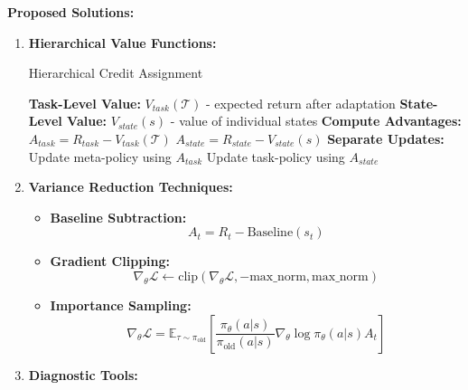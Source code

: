 \documentclass[12pt]{article}
\begin{document}
{{			\textbf{Proposed Solutions:}
			
			\begin{enumerate}
				\item \textbf{Hierarchical Value Functions:}
				
				\begin{algorithm}[H]
				\caption{Hierarchical Credit Assignment}
				\begin{algorithmic}[1]
				\STATE \textbf{Task-Level Value:} $V_{task}(\mathcal{T})$ - expected return after adaptation
				\STATE \textbf{State-Level Value:} $V_{state}(s)$ - value of individual states
				\STATE \textbf{Compute Advantages:}
				\STATE $A_{task} = R_{task} - V_{task}(\mathcal{T})$
				\STATE $A_{state} = R_{state} - V_{state}(s)$
				\STATE \textbf{Separate Updates:}
				\STATE Update meta-policy using $A_{task}$
				\STATE Update task-policy using $A_{state}$
				\end{algorithmic}
				\end{algorithm}
				
				\item \textbf{Variance Reduction Techniques:}
				
				\begin{itemize}
					\item \textbf{Baseline Subtraction:}
					\begin{equation}
					A_t = R_t - \text{Baseline}(s_t)
					\end{equation}
					
					\item \textbf{Gradient Clipping:}
					\begin{equation}
					\nabla_\theta \mathcal{L} \leftarrow \text{clip}(\nabla_\theta \mathcal{L}, -\text{max\_norm}, \text{max\_norm})
					\end{equation}
					
					\item \textbf{Importance Sampling:}
					\begin{equation}
					\nabla_\theta \mathcal{L} = \mathbb{E}_{\tau \sim \pi_{\text{old}}} \left[ \frac{\pi_\theta(a|s)}{\pi_{\text{old}}(a|s)} \nabla_\theta \log \pi_\theta(a|s) A_t \right]
					\end{equation}
				\end{itemize}
				
				\item \textbf{Diagnostic Tools:}
				

\end{enumerate}}}
\end{document}
